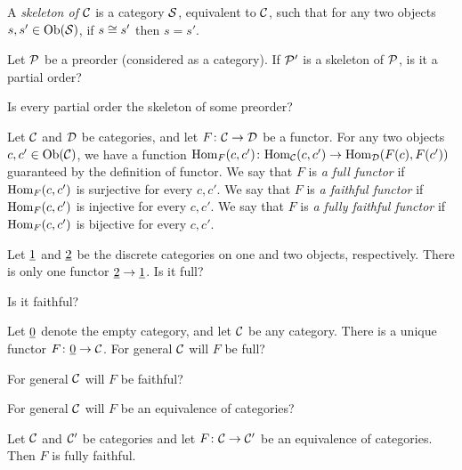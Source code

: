 \begin{definition}

A {\em skeleton of $\mathcal{C}$} is a category $\mathcal{S}$, equivalent to $\mathcal{C}$, such that for any two objects $s,s'\in\textnormal{Ob}(\mathcal{S})$, if $s\cong s'$ then $s=s'$. 

\end{definition}

\begin{exercise}
Let $\mathcal{P}$ be a preorder (considered as a category).
\sexc If $\mathcal{P}'$ is a skeleton of $\mathcal{P}$, is it a partial order?
\item Is every partial order the skeleton of some preorder?
\endsexc
\end{exercise}

\begin{definition}\label{def:full faithful}

Let $\mathcal{C}$ and $\mathcal{D}$ be categories, and let $F\colon\mathcal{C}\rightarrow\mathcal{D}$ be a functor. For any two objects $c,c'\in\textnormal{Ob}(\mathcal{C})$, we have a function $\textnormal{Hom}_F(c,c')\colon\textnormal{Hom}_\mathcal{C}(c,c')\rightarrow\textnormal{Hom}_\mathcal{D}(F(c),F(c'))$ guaranteed by the definition of functor.
We say that $F$ is {\em a full functor} if $\textnormal{Hom}_F(c,c')$ is surjective for every $c,c'$.
We say that $F$ is {\em a faithful functor} if $\textnormal{Hom}_F(c,c')$ is injective for every $c,c'$. We say that $F$ is {\em a fully faithful functor} if $\textnormal{Hom}_F(c,c')$ is bijective for every $c,c'$.

\end{definition}

\begin{exercise}
Let $\underline{1}$ and $\underline{2}$ be the discrete categories on one and two objects, respectively. There is only one functor $\underline{2}\rightarrow\underline{1}$.
\sexc Is it full?
\item Is it faithful?
\endsexc
\end{exercise}

\begin{exercise}\label{exc:empty fully faithful}
Let $\underline{0}$ denote the empty category, and let $\mathcal{C}$ be any category. There is a unique functor $F\colon \underline{0}\rightarrow\mathcal{C}$.
\sexc For general $\mathcal{C}$ will $F$ be full?
\item For general $\mathcal{C}$ will $F$ be faithful?
\item For general $\mathcal{C}$ will $F$ be an equivalence of categories?
\endsexc
\end{exercise}

\begin{proposition}

Let $\mathcal{C}$ and $\mathcal{C}'$ be categories and let $F\colon\mathcal{C}\rightarrow\mathcal{C}'$ be an equivalence of categories. Then $F$ is fully faithful.

\end{proposition}

